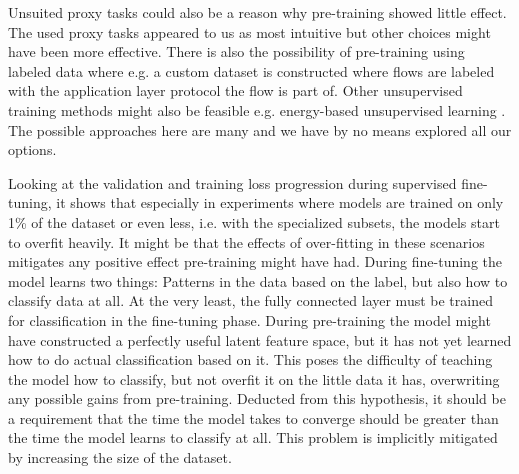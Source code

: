 Unsuited proxy tasks could also be a reason why pre-training showed little effect. The used proxy tasks appeared to us as most intuitive but other choices might have been more effective. There is also the possibility of pre-training using labeled data where e.g. a custom dataset is constructed where flows are labeled with the application layer protocol the flow is part of. Other unsupervised training methods might also be feasible e.g. energy-based unsupervised learning \cite{energy_based_training}. The possible approaches here are many and we have by no means explored all our options. \par

Looking at the validation and training loss progression during supervised fine-tuning, it shows that especially in experiments where models are trained on only 1\% of the dataset or even less, i.e. with the specialized subsets, the models start to overfit heavily. It might be that the effects of over-fitting in these scenarios mitigates any positive effect pre-training might have had. During fine-tuning the model learns two things: Patterns in the data based on the label, but also how to classify data at all. At the very least, the fully connected layer must be trained for classification in the fine-tuning phase. During pre-training the model might have constructed a perfectly useful latent feature space, but it has not yet learned how to do actual classification based on it. This poses the difficulty of teaching the model how to classify, but not overfit it on the little data it has, overwriting any possible gains from pre-training. Deducted from this hypothesis, it should be a requirement that the time the model takes to converge should be greater than the time the model learns to classify at all. This problem is implicitly mitigated by increasing the size of the dataset.\par

